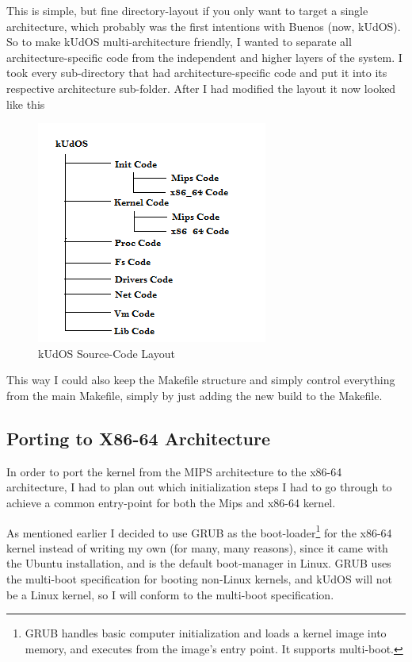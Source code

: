 This is simple, but fine directory-layout if you only want to target a single architecture, which probably was the first intentions with Buenos (now, kUdOS). So to make kUdOS multi-architecture friendly, I wanted to separate all architecture-specific code from the independent and higher layers of the system. I took every sub-directory that had architecture-specific code and put it into its respective architecture sub-folder. After I had modified the layout it now looked like this

\begin{figure}[h]
    \centering
    \includegraphics{DirectoryLayoutEnd.png}
    \caption{kUdOS Source-Code Layout}
    \label{fig:code_layout_end}
\end{figure}

This way I could also keep the Makefile structure and simply control everything from the main Makefile, simply by just adding the new build to the Makefile.

\subsection{Porting to X86-64 Architecture}

In order to port the kernel from the MIPS architecture to the x86-64 architecture, I had to plan out which initialization steps I had to go through to achieve a common entry-point for both the Mips and x86-64 kernel.

As mentioned earlier I decided to use GRUB as the boot-loader\footnote{GRUB handles basic computer initialization and loads a kernel image into memory, and executes from the image's entry point. It supports multi-boot.} for the x86-64 kernel instead of writing my own (for many, many reasons), since it came with the Ubuntu installation, and is the default boot-manager in Linux. GRUB uses the multi-boot specification for booting non-Linux kernels, and kUdOS will not be a Linux kernel, so I will conform to the multi-boot specification.

